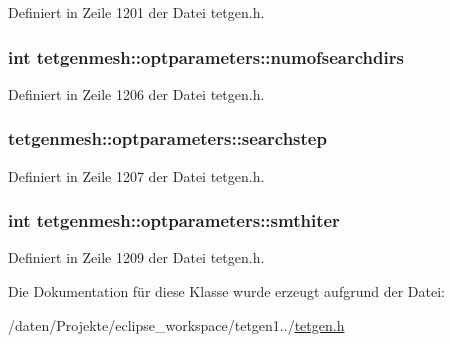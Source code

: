 Definiert in Zeile 1201 der Datei tetgen.\-h.

\hypertarget{classtetgenmesh_1_1optparameters_af6ea36aeb4f65aa694e3df5c6dcd3a8d}{
\subsubsection[{numofsearchdirs}]{\setlength{\rightskip}{0pt plus 5cm}int tetgenmesh\-::optparameters\-::numofsearchdirs}}\label{classtetgenmesh_1_1optparameters_af6ea36aeb4f65aa694e3df5c6dcd3a8d}


Definiert in Zeile 1206 der Datei tetgen.\-h.

\hypertarget{classtetgenmesh_1_1optparameters_ace9dd689b3cb7b135573b46fbf6afed2}{
\subsubsection[{searchstep}]{ tetgenmesh\-::optparameters\-::searchstep}}\label{classtetgenmesh_1_1optparameters_ace9dd689b3cb7b135573b46fbf6afed2}


Definiert in Zeile 1207 der Datei tetgen.\-h.

\hypertarget{classtetgenmesh_1_1optparameters_a7c01e6bed6c1f6188f7408f84b9644d9}{
\subsubsection[{smthiter}]{\setlength{\rightskip}{0pt plus 5cm}int tetgenmesh\-::optparameters\-::smthiter}}\label{classtetgenmesh_1_1optparameters_a7c01e6bed6c1f6188f7408f84b9644d9}


Definiert in Zeile 1209 der Datei tetgen.\-h.



Die Dokumentation für diese Klasse wurde erzeugt aufgrund der Datei\-:\begin{DoxyCompactItemize}
\item 
/daten/\-Projekte/eclipse\-\_\-workspace/tetgen1../\hyperlink{tetgen_8h}{tetgen.\-h}\end{DoxyCompactItemize}
